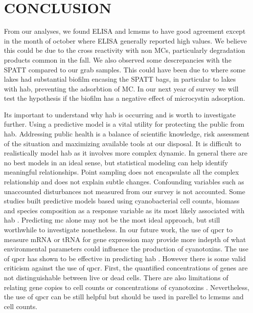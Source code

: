\chapter{CONCLUSION}

From our analyses, we found ELISA and \gls{lcmsms} to have good agreement except in the month of october where ELISA generally reported high values. We believe this could be due to the cross reactivity with non MCs, particularly degradation products common in the fall. We also observed some descrepancies with the SPATT compared to our grab samples. This could have been due to where some lakes had substantial biofilm encasing the SPATT bags, in particular to lakes with \gls{hab}, preventing the adsorbtion of MC. In our next year of survey we will test the hypothesis if the biofilm has a negative effect of microcystin adsorption.

Its important to understand why \gls{hab} is occurring and is worth to investigate further. Using a predictive model is a vital utility for protecting the public from \gls{hab}. Addressing public health is a balance of scientific knowledge, risk assessment of the situation and maximizing available tools at our disposal. It is difficult to realistically model \gls{hab} as it involves more complex dynamic. In general there are no best models in an ideal sense, but statistical modeling can help identify meaningful relationships. Point sampling does not encapsulate all the complex relationship and does not explain subtle changes. Confounding variables such as unaccounted disturbances not measured from our survey is not accounted. Some studies built predictive models based using cyanobacterial cell counts, biomass and species composition as a response variable as its most likely associated with \gls{hab} \cite{moore_richard_cyanobacterial_1993, ahn_evaluation_2011, jiang_statistical_2008, beaulieu_nutrients_2013, taranu_predicting_2017}. Predicting \gls{mc} alone may not be the most ideal approach, but still worthwhile to investigate nonetheless. In our future work, the use of \gls{qpcr} to measure mRNA or tRNA for gene expression may provide more indepth of what environmental parameters could influence the production of cyanotoxins. The use of \gls{qpcr} has shown to be effective in predicting \gls{hab} \cite{wilson_genetic_2005}. However there is some valid criticism against the use of \gls{qpcr}. First, the quantified concentrations of genes are not distinguishable between live or dead cells. There are also limitations of relating gene copies to cell counts or concentrations of cyanotoxins \cite{pacheco_is_2016}. Nevertheless, the use of \gls{qpcr} can be still helpful but should be used in parellel to \gls{lcmsms} and cell counts.






